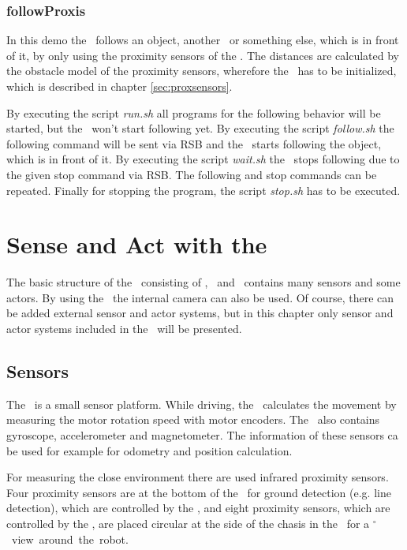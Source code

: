 \subsection{followProxis}

In this demo the \amiro\ follows an object, another \amiro\ or something else, which is in front of it, by only using the proximity sensors of the \proxring. The distances are calculated by the obstacle model of the proximity sensors, wherefore the \proxring\ has to be initialized, which is described in chapter \ref{sec:proxsensors}.

By executing the script {\it run.sh} all programs for the following behavior will be started, but the \amiro\ won't start following yet. By executing the script {\it follow.sh} the following command will be sent via RSB and the \amiro\ starts following the object, which is in front of it. By executing the script {\it wait.sh} the \amiro\ stops following due to the given stop command via RSB. The following and stop commands can be repeated. Finally for stopping the program, the script {\it stop.sh} has to be executed.

\chapter{Sense and Act with the \amiro}

The basic structure of the \amiro\ consisting of \diwheel, \power\ and \light\ contains many sensors and some actors. By using the \cognition\ the internal camera can also be used. Of course, there can be added external sensor and actor systems, but in this chapter only sensor and actor systems included in the \amiro\ will be presented.

\section{Sensors}
\label{sec:sensors}

The \amiro\ is a small sensor platform. While driving, the \diwheel\ calculates the movement by measuring the motor rotation speed with motor encoders. The \diwheel\ also contains gyroscope, accelerometer and magnetometer. The information of these sensors ca be used for example for odometry and position calculation.

For measuring the close environment there are used infrared proximity sensors. Four proximity sensors are at the bottom of the \amiro\ for ground detection (e.g. line detection), which are controlled by the \diwheel, and eight proximity sensors, which are controlled by the \power, are placed circular at the side of the chasis in the \proxring\ for a \unit[360]{$^{\circ}$} view around the robot.

